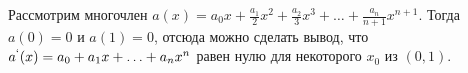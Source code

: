 \documentclass{article}
\begin{document}
Рассмотрим многочлен $a(x)=a_0x+\frac{a_1}{2}x^2+\frac{a_2}{3}x^3+\ldots+\frac{a_n}{n+1}x^{n+1}$. Тогда $a(0)=0$ и $a(1)=0$, отсюда можно сделать вывод, что $a^{`}(x)=a_0+a_1x+\ldots+a_nx^n$ равен нулю для некоторого $x_0$ из $(0,1)$. 
\end{document}
